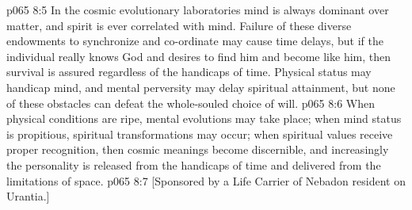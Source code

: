 \vs p065 8:5 \pc In the cosmic evolutionary laboratories mind is always dominant over matter, and spirit is ever correlated with mind. Failure of these diverse endowments to synchronize and co\hyp{}ordinate may cause time delays, but if the individual really knows God and desires to find him and become like him, then survival is assured regardless of the handicaps of time. Physical status may handicap mind, and mental perversity may delay spiritual attainment, but none of these obstacles can defeat the whole\hyp{}souled choice of will.
\vs p065 8:6 When physical conditions are ripe,  mental evolutions may take place; when mind status is propitious,  spiritual transformations may occur; when spiritual values receive proper recognition, then cosmic meanings become discernible, and increasingly the personality is released from the handicaps of time and delivered from the limitations of space.
\vsetoff
\vs p065 8:7 [Sponsored by a Life Carrier of Nebadon resident on Urantia.]
